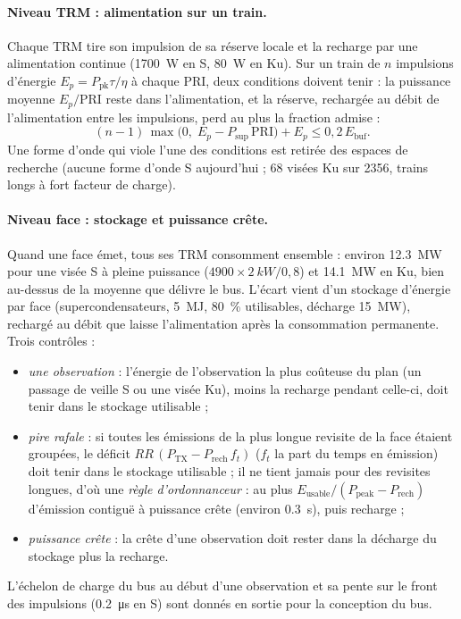 \documentclass[11pt,a4paper]{article}
\begin{document}
\paragraph{Niveau TRM : alimentation sur un train.} Chaque TRM tire son impulsion de sa réserve locale et la recharge
par une alimentation continue (\SI{1700}{W} en S, \SI{80}{W} en Ku). Sur un train de $n$ impulsions d'énergie
$E_p = P_{\mathrm{pk}}\tau/\eta$ à chaque PRI, deux conditions doivent tenir : la puissance moyenne $E_p/\mathrm{PRI}$
reste dans l'alimentation, et la réserve, rechargée au débit de l'alimentation entre les impulsions, perd au plus la
fraction admise :
\[
  (n-1)\,\max\bigl(0,\;E_p - P_{\mathrm{sup}}\,\mathrm{PRI}\bigr) + E_p \le 0,2\,E_{\mathrm{buf}}.
\]
Une forme d'onde qui viole l'une des conditions est retirée des espaces de recherche (aucune forme d'onde S
aujourd'hui ; 68 visées Ku sur \num{2356}, trains longs à fort facteur de charge).

\paragraph{Niveau face : stockage et puissance crête.} Quand une face émet, tous ses TRM consomment ensemble : environ
\SI{12.3}{MW} pour une visée S à pleine puissance ($\num{4900}\times\SI{2}{kW}/0,8$) et \SI{14.1}{MW} en Ku, bien
au-dessus de la moyenne que délivre le bus. L'écart vient d'un stockage d'énergie par face (supercondensateurs,
\SI{5}{MJ}, \SI{80}{\percent} utilisables, décharge \SI{15}{MW}), rechargé au débit que laisse l'alimentation après la
consommation permanente. Trois contrôles :
\begin{itemize}
  \item \emph{une observation} : l'énergie de l'observation la plus coûteuse du plan (un passage de veille S ou une
        visée Ku), moins la recharge pendant celle-ci, doit tenir dans le stockage utilisable ;
  \item \emph{pire rafale} : si toutes les émissions de la plus longue revisite de la face étaient groupées, le
        déficit $RR\,(P_{\mathrm{TX}} - P_{\mathrm{rech}}\,f_t)$ ($f_t$ la part du temps en émission) doit tenir dans
        le stockage utilisable ; il ne tient jamais pour des revisites longues, d'où une \emph{règle d'ordonnanceur} :
        au plus $E_{\mathrm{usable}}/(P_{\mathrm{peak}} - P_{\mathrm{rech}})$ d'émission contiguë à puissance crête
        (environ \SI{0.3}{s}), puis recharge ;
  \item \emph{puissance crête} : la crête d'une observation doit rester dans la décharge du stockage plus la recharge.
\end{itemize}
L'échelon de charge du bus au début d'une observation et sa pente sur le front des impulsions (\SI{0.2}{\micro s} en
S) sont donnés en sortie pour la conception du bus.
\end{document}
